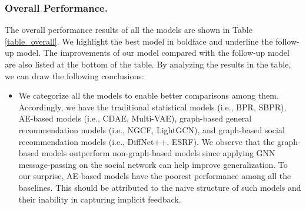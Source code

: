 \documentclass[letterpaper]{article} %
\begin{document}
\subsubsection{Overall Performance.}
The overall performance results of all the models are shown in Table \ref{table_overall}. We highlight the best model in boldface and underline the follow-up model. The improvements of our model compared with the follow-up model are also listed at the bottom of the table. By analyzing the results in the table, we can draw the following conclusions:
\begin{itemize}
    \item We categorize all the models to enable better comparisons among them. Accordingly, we have the traditional statistical models (i.e., BPR, SBPR), AE-based models (i.e., CDAE, Multi-VAE), graph-based general recommendation models (i.e., NGCF, LightGCN), and graph-based social recommendation models (i.e., DiffNet++, ESRF). We observe that the graph-based models outperform non-graph-based models since applying GNN message-passing on the social network can help improve generalization. To our surprise, AE-based models have the poorest performance among all the baselines. This should be attributed to the naive structure of such models and their inability in capturing implicit feedback.

\end{itemize}
\end{document}
